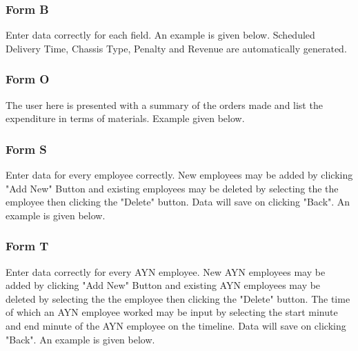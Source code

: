 \documentclass{l3proj}
\begin{document}
\subsubsection{Form B}
Enter data correctly for each field. An example is given below. Scheduled Delivery Time, Chassis Type, Penalty and Revenue are automatically generated.
\subsubsection{Form O}
The user here is presented with a summary of the orders made and list the expenditure in terms of materials. Example given below.
\subsubsection{Form S}
Enter data for every employee correctly. New employees may be added by clicking "Add New" Button and existing employees may be deleted by selecting the the employee then clicking the "Delete" button. Data will save on clicking "Back". An example is given below.
\subsubsection{Form T}
Enter data correctly for every AYN employee. New AYN employees may be added by clicking "Add New" Button and existing AYN employees may be deleted by selecting the the employee then clicking the "Delete" button. The time of which an AYN employee worked may be input by selecting the start minute and end minute of the AYN employee on the timeline. Data will save on clicking "Back". An example is given below.



\end{document}

